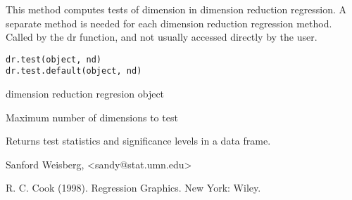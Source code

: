 \begin{Description}\relax
This method computes tests of dimension in dimension reduction regression.
A separate method is needed for each dimension reduction regression method.
Called by the dr function, and not usually accessed directly by the user.
\end{Description}
\begin{Usage}
\begin{verbatim}
dr.test(object, nd) 
dr.test.default(object, nd)
\end{verbatim}
\end{Usage}
\begin{Arguments}
\begin{ldescription}
\item[\code{object}] dimension reduction regresion object 
\item[\code{nd}] Maximum number of dimensions to test 
\end{ldescription}
\end{Arguments}
\begin{Value}
Returns test statistics and significance levels in a data frame.
\end{Value}
\begin{Author}\relax
Sanford Weisberg, <sandy@stat.umn.edu>
\end{Author}
\begin{References}\relax
R. C. Cook (1998).  Regression Graphics. New York:  Wiley.
\end{References}
\begin{SeeAlso}\relax
{}
\end{SeeAlso}

